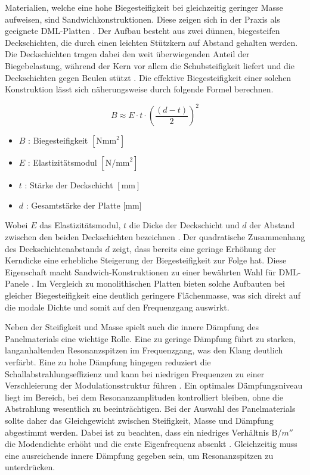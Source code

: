  Materialien, welche eine hohe Biegesteifigkeit bei gleichzeitig geringer Masse aufweisen, sind Sandwichkonstruktionen. Diese zeigen sich in der Praxis als geeignete DML-Platten \cite{Bai2001}. Der Aufbau besteht aus zwei dünnen, biegesteifen Deckschichten, die durch einen leichten Stützkern auf Abstand gehalten werden. Die Deckschichten tragen dabei den weit überwiegenden Anteil der Biegebelastung, während der Kern vor allem die Schubsteifigkeit liefert und die Deckschichten gegen Beulen stützt \cite{Wiedemann2006}. Die effektive Biegesteifigkeit einer solchen Konstruktion lässt sich näherungsweise durch folgende Formel berechnen.

\begin{equation}
B \approx E \cdot t \cdot \left(\frac{(d-t)}{2}\right)^2
\label{eq:biegesteifigkeit}
\end{equation}

\begin{itemize}
    \item $B$ : Biegesteifigkeit $[\text{Nmm}^2]$
    \item $E$ : Elastizitätsmodul $[\text{N/mm}^2]$
    \item $t$ : Stärke der Deckschicht $[\text{mm}]$
    \item $d$ : Gesamtstärke der Platte [mm]
\end{itemize}

Wobei $E$ das Elastizitätsmodul, $t$ die Dicke der Deckschicht und $d$ der Abstand zwischen den beiden
Deckschichten bezeichnen \cite{Wiedemann2006}. Der quadratische Zusammenhang des Deckschichtenabstands $d$ zeigt, dass bereits eine geringe Erhöhung der Kerndicke eine erhebliche Steigerung der Biegesteifigkeit zur Folge hat. Diese Eigenschaft macht Sandwich-Konstruktionen zu einer bewährten Wahl für DML-Panele \cite{Bai2001}. Im Vergleich zu monolithischen Platten bieten solche Aufbauten bei gleicher Biegesteifigkeit eine deutlich geringere Flächenmasse, was sich direkt auf die modale Dichte und somit auf den Frequenzgang auswirkt.

Neben der Steifigkeit und Masse spielt auch die innere Dämpfung des Panelmaterials eine wichtige Rolle. Eine zu geringe Dämpfung führt zu starken, langanhaltenden Resonanzspitzen im Frequenzgang, was den Klang deutlich verfärbt. Eine zu hohe Dämpfung hingegen reduziert die Schallabstrahlungseffizienz und kann bei niedrigen Frequenzen zu einer Verschleierung der Modulationsstruktur führen \cite{Moeser2010}. Ein optimales Dämpfungsniveau liegt im Bereich, bei dem Resonanzamplituden kontrolliert bleiben, ohne die Abstrahlung wesentlich zu beeinträchtigen. Bei der Auswahl des Panelmaterials sollte daher das Gleichgewicht zwischen Steifigkeit, Masse und Dämpfung abgestimmt werden. Dabei ist zu beachten, dass ein niedriges Verhältnis B/$m''$ die Modendichte erhöht und die erste Eigenfrequenz absenkt \cite{Moeser2010}. Gleichzeitig muss eine ausreichende innere Dämpfung gegeben sein, um Resonanzspitzen zu unterdrücken. 

